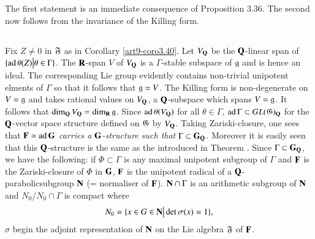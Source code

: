 The first statement is an immediate consequence of Proposition 3.36. The second now follows from the invariance of the Killing form.

\setcounter{subsection}{40}
\subsection{}\label{art9-subsec3.41}
Fix $Z \neq 0$ in $\mathfrak{F}$ as in Corollary \ref{art9-coro3.40}. Let $V_{\mathbf{Q}}$ be the $\mathbf{Q}$-linear span of $\{\operatorname{ad}  \theta(Z) \big| \theta \in\Gamma\}$. The $\mathbf{R}$-span $V$ of $V_{\mathbf{Q}}$ is a $\Gamma$-stable subspace of $\mathfrak{g}$ and is hence an ideal. The corresponding Lie group evidently contains non-trivial unipotent elments of $\Gamma$ so that it follows that $\mathfrak{g} = V$. The Killing form is non-degenerate on $V = \mathfrak{g}$ and takes rational values on $V_{\mathbf{Q}}$, a $\mathbf{Q}$-subspace which spans $V = \mathfrak{g}$. It follows that $\dim_{\mathbf{Q}} V_{\mathbf{Q}} = \dim_{\mathbf{R}} \mathfrak{g}$. Since $\operatorname{ad} \theta (V_{\mathbf{Q}})$ for all $\theta \in \Gamma$, $\operatorname{ad} \Gamma \subset GL (\mathfrak{G})_{\mathbf{Q}}$ for the $\mathbf{Q}$-vector space structure defined on $\mathfrak{G}$ by $V_{\mathbf{Q}}$. Taking Zariski-closure, one sees that $\mathbf{F} \simeq \operatorname{ad} \mathbf{G}$ \textit{ carries a $\mathbf{G}$-structure such that $\Gamma \subset \mathbf{G}_{\mathbf{Q}}$}. Moreover it is easily seen that this $\mathbf{Q}$-structure is the same as the introduced in Theorem \label{art9-thm3.37}. Since $\Gamma \subset \mathbf{G}_{\mathbf{Q}}$, we have the following: if $\Phi \subset \Gamma$ is any maximal unipotent subgroup of $\Gamma$ and $\mathbf{F}$ is the Zariski-closure of $\Phi$ in $\mathbf{G}$, $\mathbf{F}$ is the unipotent radical of a $\mathbf{Q}$-parabolic\pageoriginale subgroup $\mathbf{N}$ (= normaliser of $\mathbf{F}$). $\mathbf{N} \cap \Gamma$ is an arithmetic subgroup of $\mathbf{N}$ and $N_0 / N_0 \cap \Gamma$ is compact where
$$
N_0 = \{x \in G \in \mathbf{N} \big| \det \sigma (x) = 1\},
$$
$\sigma$ begin the adjoint representation of $\mathbf{N}$ on the Lie algebra $\mathfrak{F}$ of $\mathbf{F}$.



